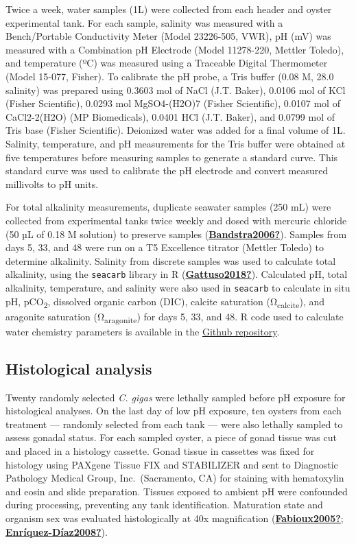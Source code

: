 \documentclass [11pt, proquest] {uwthesis}[2015/03/03]
\begin{document}
Twice a week, water samples (1L) were collected from each header and oyster experimental tank. For each sample, salinity was measured with a Bench/Portable Conductivity Meter (Model 23226-505, VWR), pH (mV) was measured with a Combination pH Electrode (Model 11278-220, Mettler Toledo), and temperature (ºC) was measured using a Traceable Digital Thermometer (Model 15-077, Fisher). To calibrate the pH probe, a Tris buffer (0.08 M, 28.0 salinity) was prepared using 0.3603 mol of NaCl (J.T. Baker), 0.0106 mol of KCl (Fisher Scientific), 0.0293 mol MgSO4-(H2O)7 (Fisher Scientific), 0.0107 mol of CaCl2-2(H2O) (MP Biomedicals), 0.0401 HCl (J.T. Baker), and 0.0799 mol of Tris base (Fisher Scientific). Deionized water was added for a final volume of 1L. Salinity, temperature, and pH measurements for the Tris buffer were obtained at five temperatures before measuring samples to generate a standard curve. This standard curve was used to calibrate the pH electrode and convert measured millivolts to pH units.

For total alkalinity measurements, duplicate seawater samples (250 mL) were collected from experimental tanks twice weekly and dosed with mercuric chloride (50 µL of 0.18 M solution) to preserve samples (\protect\hyperlink{ref-Bandstra2006}{\textbf{Bandstra2006?}}). Samples from days 5, 33, and 48 were run on a T5 Excellence titrator (Mettler Toledo) to determine alkalinity. Salinity from discrete samples was used to calculate total alkalinity, using the \texttt{seacarb} library in R (\protect\hyperlink{ref-Gattuso2018}{\textbf{Gattuso2018?}}). Calculated pH, total alkalinity, temperature, and salinity were also used in \texttt{seacarb} to calculate in situ pH, pCO\textsubscript{2}, dissolved organic carbon (DIC), calcite saturation (Ω\textsubscript{calcite}), and aragonite saturation (Ω\textsubscript{aragonite}) for days 5, 33, and 48. R code used to calculate water chemistry parameters is available in the \href{https://github.com/RobertsLab/paper-gigas-early-gametogenic-exposure}{Github repository}.

\hypertarget{histological-analysis}{%
\subsection{Histological analysis}\label{histological-analysis}}

Twenty randomly selected \emph{C. gigas} were lethally sampled before pH exposure for histological analyses. On the last day of low pH exposure, ten oysters from each treatment --- randomly selected from each tank --- were also lethally sampled to assess gonadal status. For each sampled oyster, a piece of gonad tissue was cut and placed in a histology cassette. Gonad tissue in cassettes was fixed for histology using PAXgene Tissue FIX and STABILIZER and sent to Diagnostic Pathology Medical Group, Inc.~(Sacramento, CA) for staining with hematoxylin and eosin and slide preparation. Tissues exposed to ambient pH were confounded during processing, preventing any tank identification. Maturation state and organism sex was evaluated histologically at 40x magnification (\protect\hyperlink{ref-Fabioux2005}{\textbf{Fabioux2005?}}; \protect\hyperlink{ref-Enruxedquez-Duxedaz2008}{\textbf{Enríquez-Díaz2008?}}).
\end{document}
